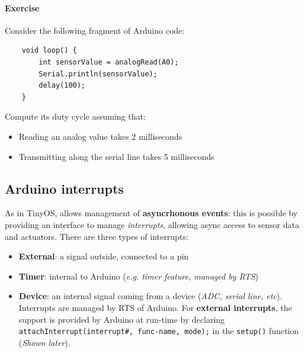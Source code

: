 \documentclass[10pt,a4paper]{report}
\theoremstyle{definition}
\begin{document}
\paragraph{Exercise}\label{sec:exercise}
Consider the following fragment of Arduino code:
\begin{verbatim}
	void loop() { 
		int sensorValue = analogRead(A0);
		Serial.println(sensorValue); 
		delay(100);
	}
\end{verbatim}

Compute its duty cycle assuming that:
\begin{itemize}
	\item 
	Reading an analog value takes 2 milliseconds
	\item 
	Transmitting along the serial line takes 5 milliseconds
\end{itemize}
\subsection{Arduino interrupts}\label{sec:arduino-interrupts}
As in TinyOS, allows management of \textbf{asyncrhonous events}: this is possible by providing an interface to manage \textit{interrupts}, allowing async access to sensor data and actuators. There are three types of interrupts:
\begin{itemize}
	\item 
	\textbf{External}: a signal outside, connected to a pin
	\item 
	\textbf{Timer}: internal to Arduino (\textit{e.g. timer feature, managed by RTS})
	\item 
	\textbf{Device}: an internal signal coming from a device (\textit{ADC, serial line, etc}).
	Interrupts are managed by RTS of Arduino. For \textbf{external interrupts}, the support is provided by Arduino at run-time by declaring \texttt{attachInterrupt(interrupt\#, func-name, mode);} in the \texttt{setup()} function (\textit{Shown later}).
\end{itemize}
\end{document}

